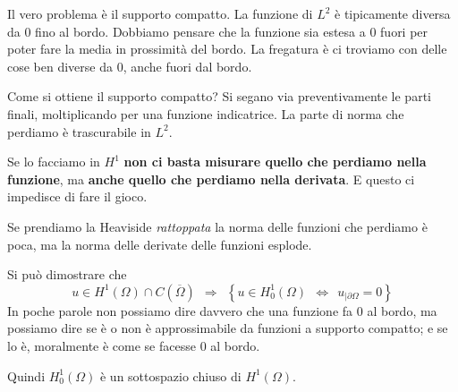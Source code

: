 \documentclass[10pt,a4paper,twoside,openright]{book}
\begin{document}
Il vero problema è il supporto compatto. La funzione di $L^{2}$ è tipicamente diversa da $0$ fino al bordo. Dobbiamo pensare che la funzione sia estesa a $0$ fuori per poter fare la media in prossimità del bordo. La fregatura è ci troviamo con delle cose ben diverse da $0$, anche fuori dal bordo.

Come si ottiene il supporto compatto? Si segano via preventivamente le parti finali, moltiplicando per una funzione indicatrice. La parte di norma che perdiamo è trascurabile in $L^{2}$.

Se lo facciamo in $H^{1}$ \textbf{non ci basta misurare quello che perdiamo nella funzione}, ma \textbf{anche quello che perdiamo nella derivata}. E questo ci impedisce di fare il gioco.

Se prendiamo la Heaviside \textit{rattoppata} la norma delle funzioni che perdiamo è poca, ma la norma delle derivate delle funzioni esplode.



Si può dimostrare che
\begin{equation*}
	u\in H^{1}( \Omega ) \cap C(\overline{\Omega }) \ \ \Rightarrow \ \ \left\{u\in H^{1}_{0}( \Omega ) \ \ \Leftrightarrow \ \ u_{|\partial \Omega } =0\right\}
\end{equation*}
In poche parole non possiamo dire davvero che una funzione fa $0$ al bordo, ma possiamo dire se è o non è approssimabile da funzioni a supporto compatto; e se lo è, moralmente è come se facesse $0$ al bordo.

Quindi $H^{1}_{0}( \Omega )$ è un sottospazio chiuso di $H^{1}( \Omega )$.
\end{document}
